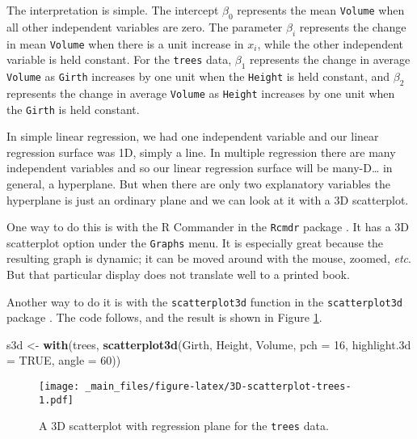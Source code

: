 \documentclass[]{book}
\newenvironment{Shaded}{\begin{snugshade}}{\end{snugshade}}
\newcommand{\KeywordTok}[1]{\textcolor[rgb]{0.13,0.29,0.53}{\textbf{{#1}}}}
\newcommand{\DataTypeTok}[1]{\textcolor[rgb]{0.13,0.29,0.53}{{#1}}}
\newcommand{\DecValTok}[1]{\textcolor[rgb]{0.00,0.00,0.81}{{#1}}}
\newcommand{\StringTok}[1]{\textcolor[rgb]{0.31,0.60,0.02}{{#1}}}
\newcommand{\OtherTok}[1]{\textcolor[rgb]{0.56,0.35,0.01}{{#1}}}
\newcommand{\NormalTok}[1]{{#1}}
\numberwithin{equation}{chapter}
\numberwithin{figure}{chapter}
\theoremstyle{plain}
\theoremstyle{definition}
\theoremstyle{remark}
\theoremstyle{definition}
\theoremstyle{definition}
\theoremstyle{remark}
\begin{document}
The interpretation is simple. The intercept \(\beta_{0}\) represents the
mean \texttt{Volume} when all other independent variables are zero. The
parameter \(\beta_{i}\) represents the change in mean \texttt{Volume}
when there is a unit increase in \(x_{i}\), while the other independent
variable is held constant. For the \texttt{trees} data, \(\beta_{1}\)
represents the change in average \texttt{Volume} as \texttt{Girth}
increases by one unit when the \texttt{Height} is held constant, and
\(\beta_{2}\) represents the change in average \texttt{Volume} as
\texttt{Height} increases by one unit when the \texttt{Girth} is held
constant.

In simple linear regression, we had one independent variable and our
linear regression surface was 1D, simply a line. In multiple regression
there are many independent variables and so our linear regression
surface will be many-D\ldots{} in general, a hyperplane. But when there
are only two explanatory variables the hyperplane is just an ordinary
plane and we can look at it with a 3D scatterplot.

One way to do this is with the R Commander in the \texttt{Rcmdr} package
\autocite{Rcmdr}. It has a 3D scatterplot option under the
\texttt{Graphs} menu. It is especially great because the resulting graph
is dynamic; it can be moved around with the mouse, zoomed, \emph{etc}.
But that particular display does not translate well to a printed book.

Another way to do it is with the \texttt{scatterplot3d} function in the
\texttt{scatterplot3d} package \autocite{scatterplot3d}. The code
follows, and the result is shown in Figure
\ref{fig:3D-scatterplot-trees}.

\begin{Shaded}
\begin{Highlighting}[]
\NormalTok{s3d <-}\StringTok{ }\KeywordTok{with}\NormalTok{(trees, }\KeywordTok{scatterplot3d}\NormalTok{(Girth, Height, Volume, }
            \DataTypeTok{pch =} \DecValTok{16}\NormalTok{, }\DataTypeTok{highlight.3d =} \OtherTok{TRUE}\NormalTok{, }\DataTypeTok{angle =} \DecValTok{60}\NormalTok{))}
\end{Highlighting}
\end{Shaded}

\begin{figure}[htbp]
\centering
\texttt{[image: \_main\_files/figure-latex/3D-scatterplot-trees-1.pdf]}
\caption{\label{fig:3D-scatterplot-trees}\small A 3D scatterplot with regression
plane for the \texttt{trees} data.}
\end{figure}
\end{document}
